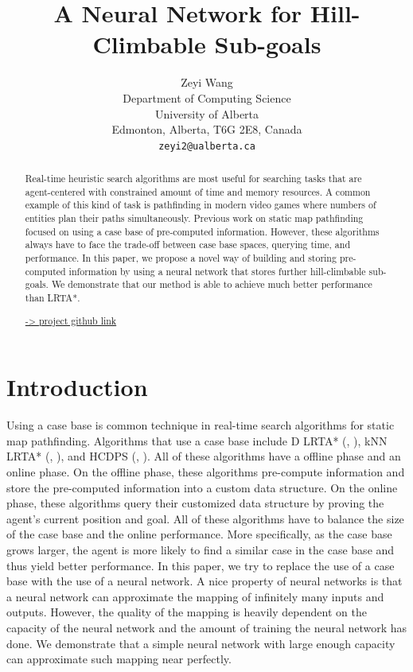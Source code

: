 \documentclass[letterpaper]{article}
\title{A Neural Network for Hill-Climbable Sub-goals}
\author{Zeyi Wang \\
    Department of Computing Science \\ University of Alberta \\
    Edmonton, Alberta, T6G 2E8, Canada \\
    {\texttt{zeyi2@ualberta.ca} }}
\newcommand{\citea}[1]{(\citeauthor{#1}, \citeyear{#1})}
\numberwithin{equation}{section}
\numberwithin{theorem}{section}
\numberwithin{lemma}{section}
\numberwithin{df}{section}
\begin{document}
    \maketitle

    \begin{abstract}
        Real-time heuristic search algorithms are most useful for searching tasks that are agent-centered with constrained amount of time and memory resources.
        A common example of this kind of task is pathfinding in modern video games where numbers of entities plan their paths simultaneously.
        Previous work on static map pathfinding focused on using a case base of pre-computed information.
        However, these algorithms always have to face the trade-off between case base spaces, querying time, and performance.
        In this paper, we propose a novel way of building and storing pre-computed information by using a neural network that stores further hill-climbable sub-goals.
        We demonstrate that our method is able to achieve much better performance than LRTA*.

        \href{https://github.com/uduse/neural-network-for-hill-climbling-subgoals}{-> project github link}

    \end{abstract}


    \section{Introduction}\label{sec:introduction}
    Using a case base is common technique in real-time search algorithms for static map pathfinding.
    Algorithms that use a case base include D LRTA* \citea{dlrta}, kNN LRTA* \citea{knnlrta}, and HCDPS \citea{hcdps}.
    All of these algorithms have a offline phase and an online phase.
    On the offline phase, these algorithms pre-compute information and store the pre-computed information into a custom data structure.
    On the online phase, these algorithms query their customized data structure by proving the agent's current position and goal.
    All of these algorithms have to balance the size of the case base and the online performance.
    More specifically, as the case base grows larger, the agent is more likely to find a similar case in the case base and thus yield better performance.
    In this paper, we try to replace the use of a case base with the use of a neural network.
    A nice property of neural networks is that a neural network can approximate the mapping of infinitely many inputs and outputs.
    However, the quality of the mapping is heavily dependent on the capacity of the neural network and the amount of training the neural network has done.
    We demonstrate that a simple neural network with large enough capacity can approximate such mapping near perfectly.
\end{document}
